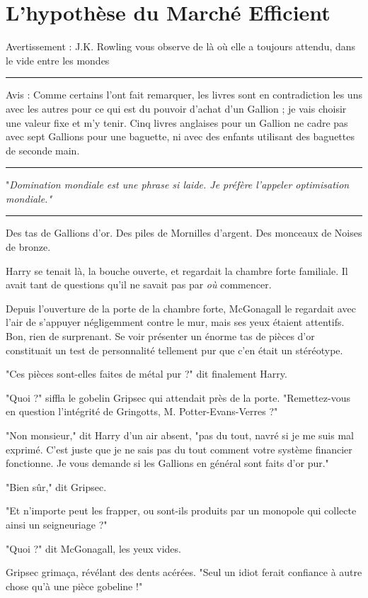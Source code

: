 
\chapter{L'hypothèse du Marché Efficient}

Avertissement : J.K. Rowling vous observe de là où elle a toujours attendu, dans le vide entre les mondes
\par\noindent\rule{\textwidth}{0.4pt}
Avis : Comme certains l'ont fait remarquer, les livres sont en contradiction les uns avec les autres pour ce qui est du pouvoir d'achat d'un Gallion ; je vais choisir une valeur fixe et m'y tenir. Cinq livres anglaises pour un Gallion ne cadre pas avec sept Gallions pour une baguette, ni avec des enfants utilisant des baguettes de seconde main.
\par\noindent\rule{\textwidth}{0.4pt}
"\emph{Domination mondiale est une phrase si laide. Je préfère l'appeler optimisation mondiale."} 
\par\noindent\rule{\textwidth}{0.4pt}
Des tas de Gallions d'or. Des piles de Mornilles d'argent. Des monceaux de Noises de bronze.

Harry se tenait là, la bouche ouverte, et regardait la chambre forte familiale. Il avait tant de questions qu'il ne savait pas par \emph{où}  commencer.

Depuis l'ouverture de la porte de la chambre forte, McGonagall le regardait avec l'air de s'appuyer négligemment contre le mur, mais ses yeux étaient attentifs. Bon, rien de surprenant. Se voir présenter un énorme tas de pièces d'or constituait un test de personnalité tellement pur que c'en était un stéréotype.

"Ces pièces sont-elles faites de métal pur ?" dit finalement Harry.

"Quoi ?" siffla le gobelin Gripsec qui attendait près de la porte. "Remettez-vous en question l'intégrité de Gringotts, M. Potter-Evans-Verres ?"

"Non monsieur," dit Harry d'un air absent, "pas du tout, navré si je me suis mal exprimé. C'est juste que je ne sais pas du tout comment votre système financier fonctionne. Je vous demande si les Gallions en général sont faits d'or pur."

"Bien sûr," dit Gripsec.

"Et n'importe peut les frapper, ou sont-ils produits par un monopole qui collecte ainsi un seigneuriage ?"

"Quoi ?" dit McGonagall, les yeux vides.

Gripsec grimaça, révélant des dents acérées. "Seul un idiot ferait confiance à autre chose qu'à une pièce gobeline !"

